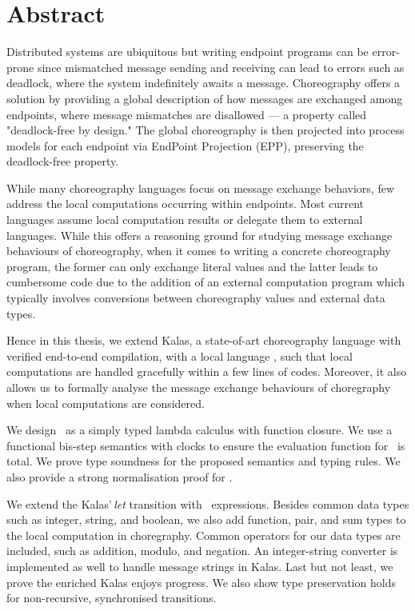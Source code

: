 \chapter*{Abstract}

Distributed systems are ubiquitous but writing endpoint programs can be 
error-prone since mismatched message sending and receiving can lead to 
errors such as deadlock, where the system indefinitely awaits a message.
Choreography offers a solution by providing a global description of how 
messages are exchanged among endpoints, where message mismatches are disallowed ---
a property called "deadlock-free by design." The global choreography 
is then projected into process models for each endpoint via EndPoint Projection (EPP),
preserving the deadlock-free property.

While many choreography languages focus on message exchange behaviors, few address 
the local computations occurring within endpoints. Most current languages assume local 
computation results or delegate them to external languages. While this offers a reasoning 
ground for studying message exchange behaviours of choreography, when it comes to writing 
a concrete choreography program, the former can only exchange literal values and the 
latter leads to cumbersome code due to the addition of an external computation program which 
typically involves conversions between choreography values and external data types.

Hence in this thesis, we extend Kalas, a state-of-art choreography language with
verified end-to-end compilation, with a local language \richerlang, such that
local computations are handled gracefully within a few lines of codes. Moreover,
it also allows us to formally analyse the message exchange behaviours of choregraphy
when local computations are considered. 

We design \richerlang\, as a simply typed lambda calculus with function closure. We use
a functional bis-step semantics with clocks to ensure the evaluation function for
\richerlang\, is total. We prove type soundness for the proposed semantics and typing rules. 
We also provide a strong normalisation proof for \richerlang.

We extend the Kalas'\,\textit{let} transition with \richerlang\, expressions. Besides common data types 
such as integer, string, and boolean, we also add function, pair, and sum types to the 
local computation in choregraphy. Common operators for our data types are included, such as addition, modulo, 
and negation. An integer-string converter is implemented as well to handle message strings 
in Kalas. Last but not least, we prove the enriched Kalas enjoys progress. We also show
type preservation holds for non-recursive, synchronised transitions.



